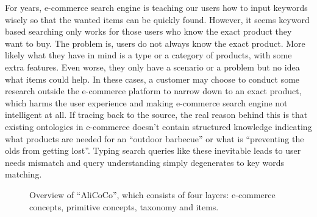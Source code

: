 For years, e-commerce search engine is teaching our users how to input keywords wisely so that the wanted items can be quickly found. 
However, it seems keyword based searching only works for those users who know the exact product they want to buy. 
The problem is, users do not always know the exact product. 
More likely what they have in mind is a type or a category of products, with some extra features. 
Even worse, they only have a scenario or a problem but no idea what items could help. 
In these cases, a customer may choose to conduct some research outside the e-commerce platform to narrow down to an exact product, which harms the user experience and making e-commerce search engine not intelligent at all. 
If tracing back to the source, 
the real reason behind this is that existing ontologies in e-commerce doesn't contain structured knowledge indicating what products are needed for an ``outdoor barbecue'' 
or what is ``preventing the olds from getting lost''. 
Typing search queries like these inevitable leads to user needs mismatch and query understanding simply degenerates to key words matching.

\begin{figure*}[th]
	\centering
	\caption{Overview of ``AliCoCo'', which consists of four layers: e-commerce concepts, primitive concepts, taxonomy and items.}
	\label{fig:overview}
\end{figure*}



